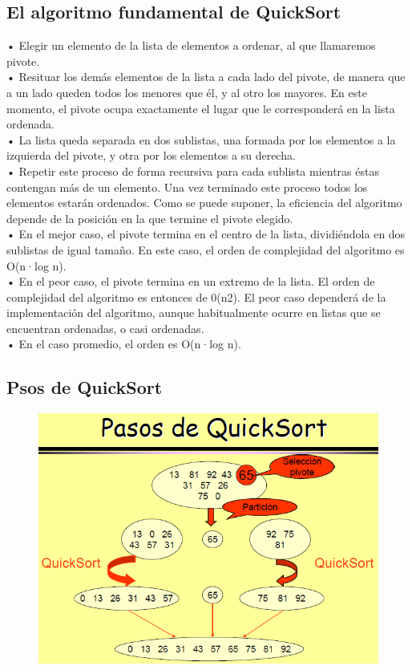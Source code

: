 \documentclass[a4,12pt]{article}
\begin{document}
\subsection{El algoritmo fundamental de QuickSort}
• Elegir un elemento de la lista de elementos a ordenar, al que llamaremos pivote.\\
• Resituar los demás elementos de la lista a cada lado del pivote, de manera que a un lado queden todos los menores que él, y al otro los mayores. En este momento, el pivote ocupa exactamente el lugar que le corresponderá en la lista ordenada.\\
• La lista queda separada en dos sublistas, una formada por los elementos a la izquierda del pivote, y otra por los elementos a su derecha.\\
• Repetir este proceso de forma recursiva para cada sublista mientras éstas contengan más de un elemento. Una vez terminado este proceso todos los elementos estarán ordenados. Como se puede suponer, la eficiencia del algoritmo depende de la posición en la que termine el pivote elegido.\\
• En el mejor caso, el pivote termina en el centro de la lista, dividiéndola en dos sublistas de igual tamaño. En este caso, el orden de complejidad del algoritmo es O(n·log n).\\
• En el peor caso, el pivote termina en un extremo de la lista. El orden de complejidad del algoritmo es entonces de 0(n2). El peor caso dependerá de la implementación del algoritmo, aunque habitualmente ocurre en listas que se encuentran ordenadas, o casi ordenadas.\\
• En el caso promedio, el orden es O(n·log n).\\

\subsection{Psos de QuickSort}
\begin{figure}[H]
  \centering
    \includegraphics{imagenes/pasosQuickSort}
\end{figure}
\end{document}
